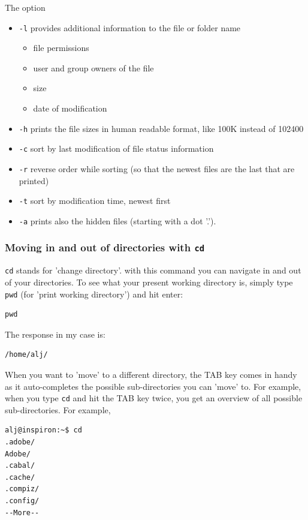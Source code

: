 \documentclass[11pt]{article}
\begin{document}
The option
\begin{itemize}
\item \texttt{-l} provides additional information to the file or folder name
\begin{itemize}
\item file permissions
\item user and group owners of the file
\item size
\item date of modification
\end{itemize}
\item \texttt{-h} prints the file sizes in human readable format, like 100K instead of 102400
\item \texttt{-c} sort by last modification of file status information
\item \texttt{-r} reverse order while sorting (so that the newest files are the last that are printed)
\item \texttt{-t} sort by modification time, newest first
\item \texttt{-a} prints also the hidden files (starting with a dot '.').
\end{itemize}

\subsubsection{Moving in and out of directories with \texttt{cd}}
\label{sec:orgheadline4}
\texttt{cd} stands for 'change directory'. with this command you can navigate
in and out of your directories. To see what your present working
directory is, simply type \texttt{pwd} (for 'print working directory') and
hit enter:

\begin{verbatim}
pwd
\end{verbatim}

The response in my case is:

\begin{verbatim}
/home/alj/
\end{verbatim}

When you want to 'move' to a different directory, the TAB key comes in
handy as it auto-completes the possible sub-directories you can 'move'
to. For example, when you type \texttt{cd} and hit the TAB key twice, you get an
overview of all possible sub-directories. For example,

\begin{verbatim}
alj@inspiron:~$ cd 
.adobe/
Adobe/
.cabal/
.cache/
.compiz/
.config/
--More--
\end{verbatim}
\end{document}
